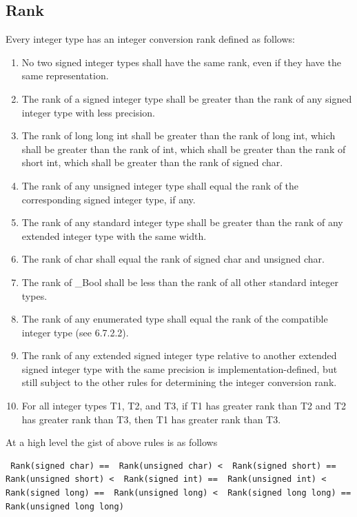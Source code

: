 \documentclass{article}
\begin{document}
\subsection{Rank}
Every integer type has an integer conversion rank defined as follows:
\begin{enumerate}[noitemsep]
    \item No two signed integer types shall have the same rank, even if they have the same representation.
    \item The rank of a signed integer type shall be greater than the rank of any signed integer
    type with less precision.
    \item The rank of long long int shall be greater than the rank of long int, which
    shall be greater than the rank of int, which shall be greater than the rank of short
    int, which shall be greater than the rank of signed char.
    \item The rank of any unsigned integer type shall equal the rank of the corresponding
    signed integer type, if any.
    \item The rank of any standard integer type shall be greater than the rank of any extended
    integer type with the same width.
    \item The rank of char shall equal the rank of signed char and unsigned char.
    \item The rank of \_Bool shall be less than the rank of all other standard integer types.
    \item The rank of any enumerated type shall equal the rank of the compatible integer type
    (see 6.7.2.2).
    \item The rank of any extended signed integer type relative to another extended signed
    integer type with the same precision is implementation-defined, but still subject to the
    other rules for determining the integer conversion rank.
    \item For all integer types T1, T2, and T3, if T1 has greater rank than T2 and T2 has
    greater rank than T3, then T1 has greater rank than T3.
\end{enumerate}
At a high level the gist of above rules is as follows
\begin{verbatim}
 Rank(signed char) ==  Rank(unsigned char) <  Rank(signed short) ==  Rank(unsigned short) <  Rank(signed int) ==  Rank(unsigned int) <  Rank(signed long) ==  Rank(unsigned long) <  Rank(signed long long) ==  Rank(unsigned long long)
\end{verbatim}
\end{document}
